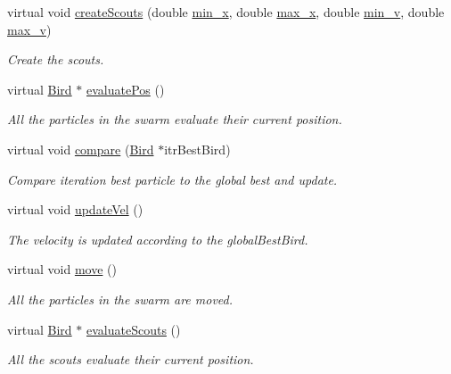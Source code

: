 \begin{CompactItemize}
virtual void \hyperlink{classSwarm_6f91dff59bba147f5983b8fb77a4db7c}{createScouts} (double \hyperlink{classSwarm_b504e23c39413573e3685a88435f5f85}{min\_\-x}, double \hyperlink{classSwarm_e5075d21be96c1cdf441bc2b612177c1}{max\_\-x}, double \hyperlink{classSwarm_160c79397ea811636e17c0e4d6297729}{min\_\-v}, double \hyperlink{classSwarm_2b0dbde2c275f991580a07a745cb5ade}{max\_\-v})
\begin{CompactList}\small\item\em Create the scouts. \item\end{CompactList}\item 
virtual \hyperlink{classBird}{Bird} $\ast$ \hyperlink{classSwarm_a7bea159365345bccd57ac10f06e812b}{evaluatePos} ()
\begin{CompactList}\small\item\em All the particles in the swarm evaluate their current position. \item\end{CompactList}\item 
virtual void \hyperlink{classSwarm_e0647f4af56497d936dafc35aa7989bf}{compare} (\hyperlink{classBird}{Bird} $\ast$itrBestBird)
\begin{CompactList}\small\item\em Compare iteration best particle to the global best and update. \item\end{CompactList}\item 
virtual void \hyperlink{classSwarm_be668c680f5bdd27bd2c4244a8a431bf}{updateVel} ()
\begin{CompactList}\small\item\em The velocity is updated according to the globalBestBird. \item\end{CompactList}\item 
virtual void \hyperlink{classSwarm_41d6aa35d312751a1f9cb6977a545beb}{move} ()
\begin{CompactList}\small\item\em All the particles in the swarm are moved. \item\end{CompactList}\item 
virtual \hyperlink{classBird}{Bird} $\ast$ \hyperlink{classSwarm_39eaa4eed93a5d2731f5b1d5ecac8fa5}{evaluateScouts} ()
\begin{CompactList}\small\item\em All the scouts evaluate their current position. \item\end{CompactList}\item 

\end{CompactItemize}
